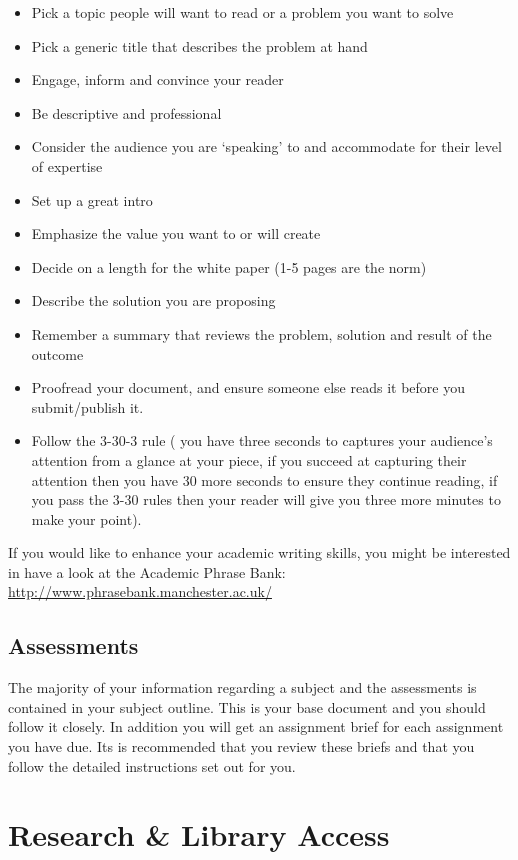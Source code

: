 \documentclass[]{book}
\providecommand{\tightlist}{%
  \setlength{\itemsep}{0pt}\setlength{\parskip}{0pt}}
\theoremstyle{definition}
\theoremstyle{definition}
\theoremstyle{remark}
\begin{document}
\begin{itemize}
\tightlist
\item
  Pick a topic people will want to read or a problem you want to solve
\item
  Pick a generic title that describes the problem at hand
\item
  Engage, inform and convince your reader
\item
  Be descriptive and professional
\item
  Consider the audience you are `speaking' to and accommodate for their
  level of expertise
\item
  Set up a great intro
\item
  Emphasize the value you want to or will create
\item
  Decide on a length for the white paper (1-5 pages are the norm)
\item
  Describe the solution you are proposing
\item
  Remember a summary that reviews the problem, solution and result of
  the outcome
\item
  Proofread your document, and ensure someone else reads it before you
  submit/publish it.
\item
  Follow the 3-30-3 rule ( you have three seconds to captures your
  audience's attention from a glance at your piece, if you succeed at
  capturing their attention then you have 30 more seconds to ensure they
  continue reading, if you pass the 3-30 rules then your reader will
  give you three more minutes to make your point).
\end{itemize}

If you would like to enhance your academic writing skills, you might be
interested in have a look at the Academic Phrase Bank:
\url{http://www.phrasebank.manchester.ac.uk/}

\subsection{Assessments}\label{assessments}

The majority of your information regarding a subject and the assessments
is contained in your subject outline. This is your base document and you
should follow it closely. In addition you will get an assignment brief
for each assignment you have due. Its is recommended that you review
these briefs and that you follow the detailed instructions set out for
you.

\section{Research \& Library Access}\label{research-library-access}
\end{document}
